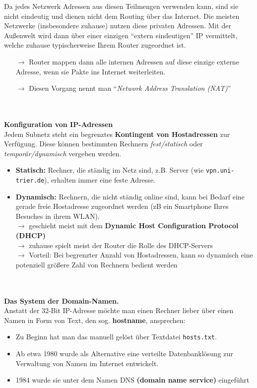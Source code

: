 %
Da jedes Netzwerk Adressen aus diesen Teilmengen verwenden kann, sind sie nicht eindeutig und dienen nicht dem Routing über das Internet. Die meisten Netzwerke (insbesondere zuhause) nutzen diese privaten Adressen. Mit der Außenwelt wird dann über einer einzigen ``extern eindeutigen'' IP vermittelt, welche zuhause typischerweise Ihrem Router zugeordnet ist.
\begin{itemize}
	\item[$\to$] Router mappen dann alle internen Adressen auf diese einzige externe Adresse, wenn sie Pakte ins Internet weiterleiten.
\item[$\to$] Diesen Vorgang nennt man ``\textit{Network Address Translation (NAT)}''
\end{itemize}
%
%
~\\~\\
\textbf{Konfiguration von IP-Adressen}\\
Jedem Subnetz steht ein begrenztes \textbf{Kontingent von Hostadressen} zur Verfügung. Diese können bestimmten Rechnern \textit{fest/statisch} oder \textit{temporär/dynamisch} vergeben werden.
\begin{itemize}
	\item \textbf{Statisch:} Rechner, die ständig im Netz sind, z.B. Server (wie \texttt{vpn.uni-trier.de}), erhalten immer eine feste Adresse.
	\item \textbf{Dynamisch:} Rechnern, die nicht ständig online sind, kann bei Bedarf eine
	gerade freie Hostadresse zugeordnet werden (zB ein Smartphone Ihres Besuches in ihrem WLAN).\\
	$\to$ geschieht meist mit dem \textbf{Dynamic Host Configuration Protocol (DHCP)}\\
	$\to$ zuhause spielt meist der Router die Rolle des DHCP-Servers\\
	$\to$ Vorteil: Bei begrenzter Anzahl von Hostadressen, kann so dynamisch eine potenziell größere Zahl von Rechnern bedient werden
\end{itemize}
%
~\\~\\
\textbf{Das System der Domain-Namen.}\\
Anstatt der 32-Bit IP-Adresse möchte man einen Rechner lieber über einen Namen in Form von Text, den sog. \textbf{hostname}, ansprechen:
\begin{itemize}
	\item Zu Beginn hat man das manuell gelöst über Textdatei \texttt{hosts.txt}.
	\item Ab etwa 1980 wurde als Alternative eine verteilte Datenbanklösung zur Verwaltung von Namen im Internet
	entwickelt.
	\item 1984 wurde sie unter dem Namen DNS \textbf{(domain name service)} eingeführt
\end{itemize}
